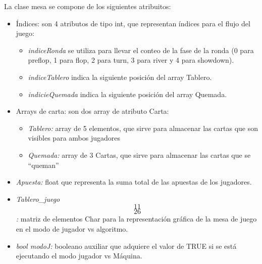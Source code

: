 La clase mesa se compone de los siguientes atribuitos:
\begin{itemize}
\item Índices: son 4 atributos de tipo int, que representan índices para el flujo del juego:
\begin{itemize}
\item  \textit{indiceRonda} se utiliza para llevar el conteo de la fase de la ronda (0 para preflop, 1 para flop, 2 para turn, 3 para river y 4 para showdown).
\item  \textit{indiceTablero} indica la siguiente posición del array Tablero.
\item  \textit{indicieQuemada} indica la siguiente posición del array Quemada.
 \end{itemize}
\item Arrays de carta: son dos array de atributo Carta:
\begin{itemize}
\item  \textit{Tablero:} array de 5 elementos, que sirve para almacenar las cartas que son visibles para ambos jugadores
\item  \textit{Quemada:} array de 3 Cartas, que sirve para almacenar las cartas que se “queman”
 \end{itemize}
\item  \textit{Apuesta:} float que representa la suma total de las apuestas de los jugadores.
\item  \textit{Tablero\_juego\[11\]\[26\]:} matriz de elementos Char para la representación gráfica de la mesa de juego en el modo de jugador vs algoritmo.
\item  \textit{bool modoJ:} booleano auxiliar que adquiere el valor de TRUE si se está ejecutando el modo jugador vs Máquina.
 \end{itemize}

